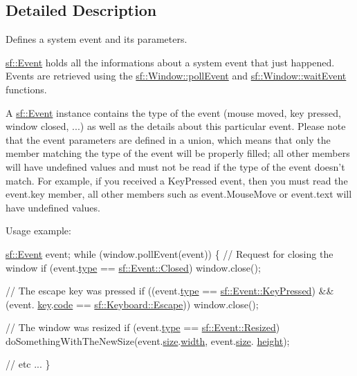 \subsection{Detailed Description}
Defines a system event and its parameters. 

\hyperlink{classsf_1_1_event}{sf\+::\+Event} holds all the informations about a system event that just happened. Events are retrieved using the \hyperlink{classsf_1_1_window_a338e996585faf82e93069858e3b531b7}{sf\+::\+Window\+::poll\+Event} and \hyperlink{classsf_1_1_window_aaf02ab64fbc1d374eef3696df54137bc}{sf\+::\+Window\+::wait\+Event} functions.

A \hyperlink{classsf_1_1_event}{sf\+::\+Event} instance contains the type of the event (mouse moved, key pressed, window closed, ...) as well as the details about this particular event. Please note that the event parameters are defined in a union, which means that only the member matching the type of the event will be properly filled; all other members will have undefined values and must not be read if the type of the event doesn't match. For example, if you received a Key\+Pressed event, then you must read the event.\+key member, all other members such as event.\+Mouse\+Move or event.\+text will have undefined values.

Usage example\+: 
\begin{DoxyCode}
\hyperlink{classsf_1_1_event}{sf::Event} event;
\textcolor{keywordflow}{while} (window.pollEvent(event))
\{
    \textcolor{comment}{// Request for closing the window}
    \textcolor{keywordflow}{if} (event.\hyperlink{classsf_1_1_event_adf2f8044f713fd9d6019077b0d1ffe0a}{type} == \hyperlink{classsf_1_1_event_af41fa9ed45c02449030699f671331d4aa316e4212e083f1dce79efd8d9e9c0a95}{sf::Event::Closed})
        window.close();

    \textcolor{comment}{// The escape key was pressed}
    \textcolor{keywordflow}{if} ((event.\hyperlink{classsf_1_1_event_adf2f8044f713fd9d6019077b0d1ffe0a}{type} == \hyperlink{classsf_1_1_event_af41fa9ed45c02449030699f671331d4aac3c7abfaa98c73bfe6be0b57df09c71b}{sf::Event::KeyPressed}) && (event.
      \hyperlink{classsf_1_1_event_a45b92fc6757ca7c193f06b302e424ab0}{key}.\hyperlink{structsf_1_1_event_1_1_key_event_a2879fdab8a68cb1c6ecc45730a2d0e61}{code} == \hyperlink{classsf_1_1_keyboard_acb4cacd7cc5802dec45724cf3314a142a64b7ecb543c5d03bec8383dde123c95d}{sf::Keyboard::Escape}))
        window.close();

    \textcolor{comment}{// The window was resized}
    \textcolor{keywordflow}{if} (event.\hyperlink{classsf_1_1_event_adf2f8044f713fd9d6019077b0d1ffe0a}{type} == \hyperlink{classsf_1_1_event_af41fa9ed45c02449030699f671331d4aa67fd26d7e520bc6722db3ff47ef24941}{sf::Event::Resized})
        doSomethingWithTheNewSize(event.\hyperlink{classsf_1_1_event_a85dae56a377eeffd39183c3f6fc96cb9}{size}.\hyperlink{structsf_1_1_event_1_1_size_event_a20ea1b78c9bb1604432f8f0067bbfd94}{width}, event.\hyperlink{classsf_1_1_event_a85dae56a377eeffd39183c3f6fc96cb9}{size}.
      \hyperlink{structsf_1_1_event_1_1_size_event_af0f76a599d5f48189cb8d78d4e5facdb}{height});

    \textcolor{comment}{// etc ...}
\}
\end{DoxyCode}
 

